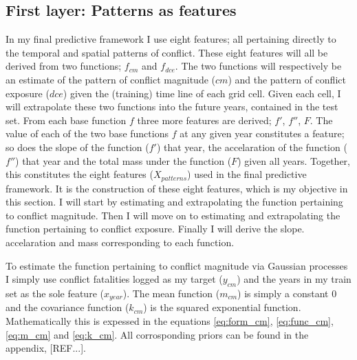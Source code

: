 \documentclass[a4paper]{article}
\begin{document}

\subsection{First layer: Patterns as features}


In my final predictive framework I use eight features; all pertaining directly to the temporal and spatial patterns of conflict. These eight features will all be derived from two functions; $f_{cm}$ and $f_{dce}$. The two functions will respectively be an estimate of the pattern of conflict magnitude ($cm$) and the pattern of conflict exposure ($dce$) given the (training) time line of each grid cell. Given each cell, I will extrapolate these two functions into the future years, contained in the test set. From each base function $f$ three more features are derived; $f'$, $f''$, $F$. The value of each of the two base functions $f$ at any given year constitutes a feature; so does the slope of the function ($f'$) that year, the accelaration of the function ($f''$) that year and the total mass under the function ($F$) given all years. Together, this constitutes the eight features ($X_{patterns}$) used in the final predictive framework. It is the construction of these eight features, which is my objective in this section. I will start by estimating and extrapolating the function pertaining to conflict magnitude. Then I will move on to estimating and extrapolating the function pertaining to conflict exposure. Finally I will derive the slope. accelaration and mass corresponding to each function.\par

To estimate the function pertaining to conflict magnitude via Gaussian processes I simply use conflict fatalities logged as my target ($y_{cm}$) and the years in my train set as the sole feature ($x_{year}$). The mean function ($m_{cm}$) is simply a constant $0$ and the covariance function ($k_{cm}$) is the squared exponential function. Mathematically this is expessed in the equations \ref{eq:form_cm}, \ref{eq:func_cm}, \ref{eq:m_cm} and \ref{eq:k_cm}. All corrosponding priors can be found in the appendix, [REF...].\par
\end{document}
